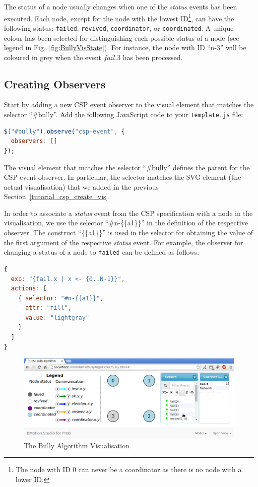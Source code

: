 The status of a node usually changes when one of the \textit{status} events has been executed.
Each node, except for the node with the lowest ID\footnote{The node with ID 0 can never be a coordinator as there is no node with a lower ID.}, can have the following status: \texttt{failed}, \texttt{revived}, \texttt{coordinator}, or \texttt{coordinated}.
A unique colour has been selected for distinguishing each possible status of a node (see legend in Fig.~\ref{fig:BullyVisState}).
For instance, the node with ID ``n-3'' will be coloured in grey when the event $fail.3$ has been processed.

\subsection{Creating Observers}

Start by adding a new CSP event observer to the visual element that matches the selector ``\#bully''.
Add the following JavaScript code to your \texttt{template.js} file:

\begin{lstlisting}[language=JavaScript]
$("#bully").observe("csp-event", {
  observers: []
});
\end{lstlisting}

The visual element that matches the selector ``\#bully'' defines the parent for the CSP event observer.
In particular, the selector matches the SVG element (the actual visualisation) that we added in the previous Section~\ref{tutorial_csp_create_vis}.

In order to associate a \textit{status} event from the CSP specification with a node in the visualisation, we use the selector ``\#n-\{\{a1\}\}'' in the definition of the respective observer. 
The construct ``\{\{a1\}\}'' is used in the selector for obtaining the value of the first argument of the respective \textit{status} event.
For example, the observer for changing a status of a node to \texttt{failed} can be defined as follows:

\begin{lstlisting}[language=JavaScript]
{
  exp: "{fail.x | x <- {0..N-1}}",
  actions: [
    { selector: "#n-{{a1}}",
      attr: "fill",
      value: "lightgray"
    }
  ]
}
\end{lstlisting}

\begin{figure}[h!]\centering
	\includegraphics[width=16cm]{img/tutorial/bully1}
	\caption{The Bully Algorithm Visualisation}
	\label{fig:bully1}
\end{figure}

